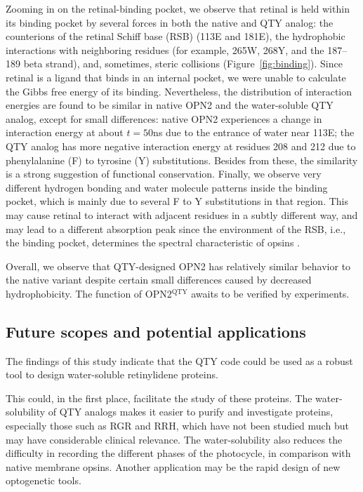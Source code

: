 \documentclass[fleqn, 10pt]{manuscript}
\begin{document}
Zooming in on the retinal-binding pocket, we observe that retinal is held within its binding pocket by several forces in both the native and QTY analog: the counterions of the retinal Schiff base (RSB) (113E and 181E), the hydrophobic interactions with neighboring residues (for example, 265W, 268Y, and the 187--189 beta strand), and, sometimes, steric collisions (Figure~\ref{fig:binding}). Since retinal is a ligand that binds in an internal pocket, we were unable to calculate the Gibbs free energy of its binding. Nevertheless, the distribution of interaction energies are found to be similar in native OPN2 and the water-soluble QTY analog, except for small differences: native OPN2 experiences a change in interaction energy at about $t=50$ns due to the entrance of water near 113E; the QTY analog has more negative interaction energy at residues 208 and 212 due to phenylalanine (F) to tyrosine (Y) substitutions. Besides from these, the similarity is a strong suggestion of functional conservation. Finally, we observe very different hydrogen bonding and water molecule patterns inside the binding pocket, which is mainly due to several F to Y substitutions in that region. This may cause retinal to interact with adjacent residues in a subtly different way, and may lead to a different absorption peak since the environment of the RSB, i.e., the binding pocket, determines the spectral characteristic of opsins \citep{Fenno_2011}. 

Overall, we observe that QTY-designed OPN2 has relatively similar behavior to the native variant despite certain small differences caused by decreased hydrophobicity. The function of OPN2$^{\textrm{QTY}}$ awaits to be verified by experiments. 

\subsection*{Future scopes and potential applications}

The findings of this study indicate that the QTY code could be used as a robust tool to design water-soluble retinylidene proteins. 

This could, in the first place, facilitate the study of these proteins. The water-solubility of QTY analogs makes it easier to purify and investigate proteins, especially those such as RGR and RRH, which have not been studied much but may have considerable clinical relevance. The water-solubility also reduces the difficulty in recording the different phases of the photocycle, in comparison with native membrane opsins. Another application may be the rapid design of new optogenetic tools. 
\end{document}
